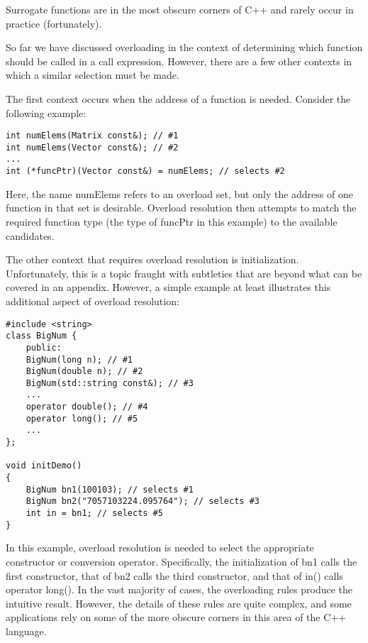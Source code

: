 Surrogate functions are in the most obscure corners of C++ and rarely occur in practice (fortunately).


So far we have discussed overloading in the context of determining which function should be called in a call expression. However, there are a few other contexts in which a similar selection must be made.

The first context occurs when the address of a function is needed. Consider the following example:

\begin{lstlisting}[style=styleCXX]
int numElems(Matrix const&); // #1
int numElems(Vector const&); // #2
...
int (*funcPtr)(Vector const&) = numElems; // selects #2
\end{lstlisting}

Here, the name numElems refers to an overload set, but only the address of one function in that set is desirable. Overload resolution then attempts to match the required function type (the type of funcPtr in this example) to the available candidates.

The other context that requires overload resolution is initialization. Unfortunately, this is a topic fraught with subtleties that are beyond what can be covered in an appendix. However, a simple example at least illustrates this additional aspect of overload resolution:

\begin{lstlisting}[style=styleCXX]
#include <string>
class BigNum {
	public:
	BigNum(long n); // #1
	BigNum(double n); // #2
	BigNum(std::string const&); // #3
	...
	operator double(); // #4
	operator long(); // #5
	...
};

void initDemo()
{
	BigNum bn1(100103); // selects #1
	BigNum bn2("7057103224.095764"); // selects #3
	int in = bn1; // selects #5
}
\end{lstlisting}

In this example, overload resolution is needed to select the appropriate constructor or conversion operator. Specifically, the initialization of bn1 calls the first constructor, that of bn2 calls the third constructor, and that of in() calls operator long(). In  the vast majority of cases, the overloading rules produce the intuitive result. However, the  details of these rules are quite complex, and some applications rely on some of the more obscure corners in this area of the C++ language.













